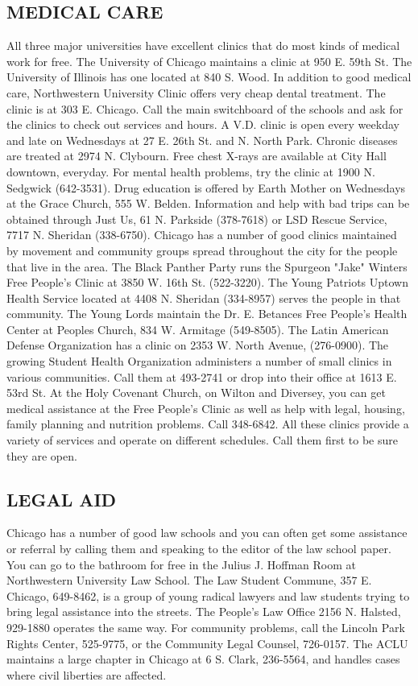 \documentclass[11pt,twoside,a4paper]{book}
\begin{document}
\subsection{MEDICAL CARE}
All three major universities have excellent clinics that do most kinds of medical work for free. The University of Chicago maintains a clinic at 950 E. 59th St. The University of Illinois has one located at 840 S. Wood. In addition to good medical care, Northwestern University Clinic offers very cheap dental treatment. The clinic is at 303 E. Chicago. Call the main switchboard of the schools and ask for the clinics to check out services and hours. A V.D. clinic is open every weekday and late on Wednesdays at 27 E. 26th St. and N. North Park. Chronic diseases are treated at 2974 N. Clybourn. Free chest X-rays are available at City Hall downtown, everyday. For mental health problems, try the clinic at 1900 N. Sedgwick (642-3531). Drug education is offered by Earth Mother on Wednesdays at the Grace Church, 555 W. Belden. Information and help with bad trips can be obtained through Just Us, 61 N. Parkside (378-7618) or LSD Rescue Service, 7717 N. Sheridan (338-6750). Chicago has a number of good clinics maintained by movement and community groups spread throughout the city for the people that live in the area. The Black Panther Party runs the Spurgeon "Jake" Winters Free People's Clinic at 3850 W. 16th St. (522-3220). The Young Patriots Uptown Health Service located at 4408 N. Sheridan (334-8957) serves the people in that community. The Young Lords maintain the Dr. E. Betances Free People's Health Center at Peoples Church, 834 W. Armitage (549-8505). The Latin American Defense Organization has a clinic on 2353 W. North Avenue, (276-0900). The growing Student Health Organization administers a number of small clinics in various communities. Call them at 493-2741 or drop into their office at 1613 E. 53rd St. At the Holy Covenant Church, on Wilton and Diversey, you can get medical assistance at the Free People's Clinic as well as help with legal, housing, family planning and nutrition problems. Call 348-6842. All these clinics provide a variety of services and operate on different schedules. Call them first to be sure they are open.~\\

\subsection{LEGAL AID}
Chicago has a number of good law schools and you can often get some assistance or referral by calling them and speaking to the editor of the law school paper. You can go to the bathroom for free in the Julius J. Hoffman Room at Northwestern University Law School. The Law Student Commune, 357 E. Chicago, 649-8462, is a group of young radical lawyers and law students trying to bring legal assistance into the streets. The People's Law Office 2156 N. Halsted, 929-1880 operates the same way. For community problems, call the Lincoln Park Rights Center, 525-9775, or the Community Legal Counsel, 726-0157. The ACLU maintains a large chapter in Chicago at 6 S. Clark, 236-5564, and handles cases where civil liberties are affected.~\\
\end{document}

